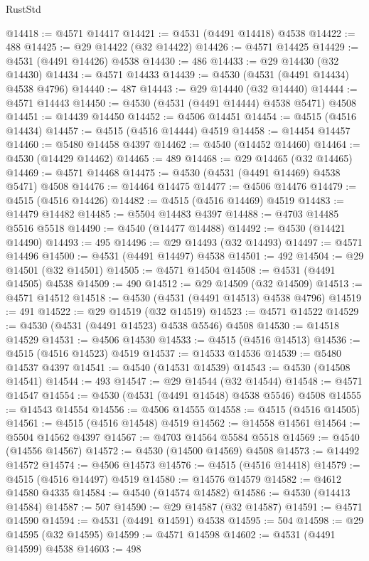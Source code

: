 \begin{lexlean}{RustStd}
\begin{coremodule}
{\begin{coremodule}
{{{{{{{{{{{{{{{{{{{{{{{{{{{{{{{{{{{{{{{{{{{{{{{{{{{{{{{@14418 := @4571 @14417
@14421 := @4531 (@4491 @14418) @4538
@14422 := 488
@14425 := @29 @14422 (@32 @14422)
@14426 := @4571 @14425
@14429 := @4531 (@4491 @14426) @4538
@14430 := 486
@14433 := @29 @14430 (@32 @14430)
@14434 := @4571 @14433
@14439 := @4530 (@4531 (@4491 @14434) @4538 @4796)
@14440 := 487
@14443 := @29 @14440 (@32 @14440)
@14444 := @4571 @14443
@14450 := @4530 (@4531 (@4491 @14444) @4538 @5471) @4508
@14451 := @14439 @14450
@14452 := @4506 @14451
@14454 := @4515 (@4516 @14434)
@14457 := @4515 (@4516 @14444) @4519
@14458 := @14454 @14457
@14460 := @5480 @14458 @4397
@14462 := @4540 (@14452 @14460)
@14464 := @4530 (@14429 @14462)
@14465 := 489
@14468 := @29 @14465 (@32 @14465)
@14469 := @4571 @14468
@14475 := @4530 (@4531 (@4491 @14469) @4538 @5471) @4508
@14476 := @14464 @14475
@14477 := @4506 @14476
@14479 := @4515 (@4516 @14426)
@14482 := @4515 (@4516 @14469) @4519
@14483 := @14479 @14482
@14485 := @5504 @14483 @4397
@14488 := @4703 @14485 @5516 @5518
@14490 := @4540 (@14477 @14488)
@14492 := @4530 (@14421 @14490)
@14493 := 495
@14496 := @29 @14493 (@32 @14493)
@14497 := @4571 @14496
@14500 := @4531 (@4491 @14497) @4538
@14501 := 492
@14504 := @29 @14501 (@32 @14501)
@14505 := @4571 @14504
@14508 := @4531 (@4491 @14505) @4538
@14509 := 490
@14512 := @29 @14509 (@32 @14509)
@14513 := @4571 @14512
@14518 := @4530 (@4531 (@4491 @14513) @4538 @4796)
@14519 := 491
@14522 := @29 @14519 (@32 @14519)
@14523 := @4571 @14522
@14529 := @4530 (@4531 (@4491 @14523) @4538 @5546) @4508
@14530 := @14518 @14529
@14531 := @4506 @14530
@14533 := @4515 (@4516 @14513)
@14536 := @4515 (@4516 @14523) @4519
@14537 := @14533 @14536
@14539 := @5480 @14537 @4397
@14541 := @4540 (@14531 @14539)
@14543 := @4530 (@14508 @14541)
@14544 := 493
@14547 := @29 @14544 (@32 @14544)
@14548 := @4571 @14547
@14554 := @4530 (@4531 (@4491 @14548) @4538 @5546) @4508
@14555 := @14543 @14554
@14556 := @4506 @14555
@14558 := @4515 (@4516 @14505)
@14561 := @4515 (@4516 @14548) @4519
@14562 := @14558 @14561
@14564 := @5504 @14562 @4397
@14567 := @4703 @14564 @5584 @5518
@14569 := @4540 (@14556 @14567)
@14572 := @4530 (@14500 @14569) @4508
@14573 := @14492 @14572
@14574 := @4506 @14573
@14576 := @4515 (@4516 @14418)
@14579 := @4515 (@4516 @14497) @4519
@14580 := @14576 @14579
@14582 := @4612 @14580 @4335
@14584 := @4540 (@14574 @14582)
@14586 := @4530 (@14413 @14584)
@14587 := 507
@14590 := @29 @14587 (@32 @14587)
@14591 := @4571 @14590
@14594 := @4531 (@4491 @14591) @4538
@14595 := 504
@14598 := @29 @14595 (@32 @14595)
@14599 := @4571 @14598
@14602 := @4531 (@4491 @14599) @4538
@14603 := 498
}}}}}}}}}}}}}}}}}}}}}}}}}}}}}}}}}}}}}}}}}}}}}}}}}}}}}}}
\end{coremodule}}
\end{coremodule}
\end{lexlean}

